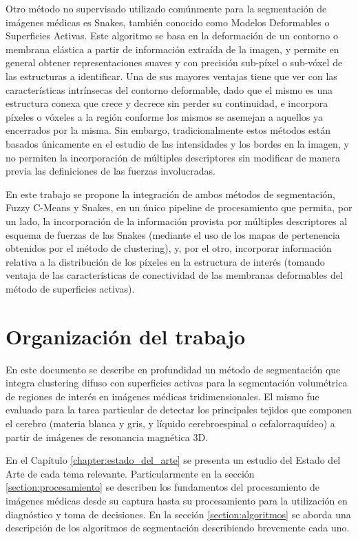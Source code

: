 Otro método no supervisado utilizado comúnmente para la segmentación de imágenes médicas es Snakes, también conocido como Modelos Deformables o Superficies Activas. Este algoritmo se basa en la deformación de un contorno o membrana elástica a partir de información extraída de la imagen, y permite en general obtener representaciones suaves y con precisión sub-píxel o sub-vóxel de las estructuras a identificar. Una de sus mayores ventajas tiene que ver con las características intrínsecas del contorno deformable, dado que el mismo es una estructura conexa que crece y decrece sin perder su continuidad, e incorpora píxeles o vóxeles a la región conforme los mismos se asemejan a aquellos ya encerrados por la misma. Sin embargo, tradicionalmente estos métodos están basados únicamente en el estudio de las intensidades y los bordes en la imagen, y no permiten la incorporación de múltiples descriptores sin modificar de manera previa las definiciones de las fuerzas involucradas.

En este trabajo se propone la integración de ambos métodos de segmentación, Fuzzy C-Means y Snakes, en un único pipeline de procesamiento que permita, por un lado, la incorporación de la información provista por múltiples descriptores al esquema de fuerzas de las Snakes (mediante el uso de los mapas de pertenencia obtenidos por el método de clustering), y, por el otro, incorporar información relativa a la distribución de los píxeles en la estructura de interés (tomando ventaja de las características de conectividad de las membranas deformables del método de superficies activas).
\section{Organización del trabajo}
En este documento se describe en profundidad un método de segmentación que integra clustering difuso con superficies activas para la segmentación volumétrica de regiones de interés en imágenes médicas tridimensionales. El mismo fue evaluado para la tarea particular de detectar los principales tejidos que componen el cerebro (materia blanca y gris, y líquido cerebroespinal o cefalorraquídeo) a partir de imágenes de resonancia magnética 3D.

En el Capítulo \ref{chapter:estado_del_arte} se presenta un estudio del Estado del Arte de cada tema relevante. Particularmente en la sección \ref{section:procesamiento} se describen los fundamentos del procesamiento de imágenes médicas desde su captura hasta su procesamiento para la utilización en diagnóstico y toma de decisiones. En la sección \ref{section:algoritmos} se aborda una descripción de los algoritmos de segmentación describiendo brevemente cada uno.


